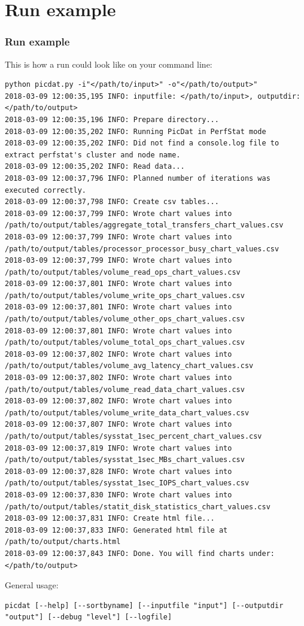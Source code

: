 \documentclass[8pt]{beamer}
\begin{document}
\section{Run example}
\begin{frame}[fragile]
\frametitle{Run example}
This is how a run could look like on your command line:
\smallskip

\begin{lstlisting}
python picdat.py -i"</path/to/input>" -o"</path/to/output>" 
2018-03-09 12:00:35,195 INFO: inputfile: </path/to/input>, outputdir: </path/to/output>
2018-03-09 12:00:35,196 INFO: Prepare directory...
2018-03-09 12:00:35,202 INFO: Running PicDat in PerfStat mode
2018-03-09 12:00:35,202 INFO: Did not find a console.log file to extract perfstat's cluster and node name.
2018-03-09 12:00:35,202 INFO: Read data...
2018-03-09 12:00:37,796 INFO: Planned number of iterations was executed correctly.
2018-03-09 12:00:37,798 INFO: Create csv tables...
2018-03-09 12:00:37,799 INFO: Wrote chart values into /path/to/output/tables/aggregate_total_transfers_chart_values.csv
2018-03-09 12:00:37,799 INFO: Wrote chart values into /path/to/output/tables/processor_processor_busy_chart_values.csv
2018-03-09 12:00:37,799 INFO: Wrote chart values into /path/to/output/tables/volume_read_ops_chart_values.csv
2018-03-09 12:00:37,801 INFO: Wrote chart values into /path/to/output/tables/volume_write_ops_chart_values.csv
2018-03-09 12:00:37,801 INFO: Wrote chart values into /path/to/output/tables/volume_other_ops_chart_values.csv
2018-03-09 12:00:37,801 INFO: Wrote chart values into /path/to/output/tables/volume_total_ops_chart_values.csv
2018-03-09 12:00:37,802 INFO: Wrote chart values into /path/to/output/tables/volume_avg_latency_chart_values.csv
2018-03-09 12:00:37,802 INFO: Wrote chart values into /path/to/output/tables/volume_read_data_chart_values.csv
2018-03-09 12:00:37,802 INFO: Wrote chart values into /path/to/output/tables/volume_write_data_chart_values.csv
2018-03-09 12:00:37,807 INFO: Wrote chart values into /path/to/output/tables/sysstat_1sec_percent_chart_values.csv
2018-03-09 12:00:37,819 INFO: Wrote chart values into /path/to/output/tables/sysstat_1sec_MBs_chart_values.csv
2018-03-09 12:00:37,828 INFO: Wrote chart values into /path/to/output/tables/sysstat_1sec_IOPS_chart_values.csv
2018-03-09 12:00:37,830 INFO: Wrote chart values into /path/to/output/tables/statit_disk_statistics_chart_values.csv
2018-03-09 12:00:37,831 INFO: Create html file...
2018-03-09 12:00:37,833 INFO: Generated html file at /path/to/output/charts.html
2018-03-09 12:00:37,843 INFO: Done. You will find charts under: </path/to/output>
\end{lstlisting}
\smallskip

General usage: 
\smallskip
\begin{lstlisting}
picdat [--help] [--sortbyname] [--inputfile "input"] [--outputdir "output"] [--debug "level"] [--logfile]
\end{lstlisting}
\end{frame}
\end{document}
